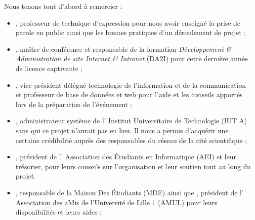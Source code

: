 Nous tenons tout d'abord à remercier :

\begin{itemize}

\item {}, professeur de technique d'expression pour nous
avoir enseigné la prise de parole en public ainsi que les bonnes
pratiques d'un déroulement de projet ;

\item {}, maître de conférence et responsable de la
formation \emph{Développement \& Administration de site Internet \&
Intranet} (DA2I) pour cette dernière année de licence captivante ;

\item {}, vice-président délégué technologie de
l'information et de la communication et professeur de base de données et
web pour l'aide et les conseils apportés lors de la préparation de
l'événement ;

\item {}, administrateur système de l' \og Institut
Universitaire de Technologie \fg{} (IUT A) sans qui ce projet n'aurait pas
eu lieu. Il nous a permis d'acquérir une certaine crédibilité auprès des
responsables du réseau de la cité scientifique ;

\item {}, président de l' \og Association des Étudiants en
Informatique \fg{} (AEI) et leur trésorier,  pour
leurs conseils sur l'organisation et leur soutien tout au long du
projet.

\item {}, responsable de la \og Maison Des Étudiants \fg{}
(MDE) ainsi que , président de l' \og Association des aMis
de l'Université de Lille 1 \fg{} (AMUL) pour leurs disponibilités et
leurs aides ;

\end{itemize}
